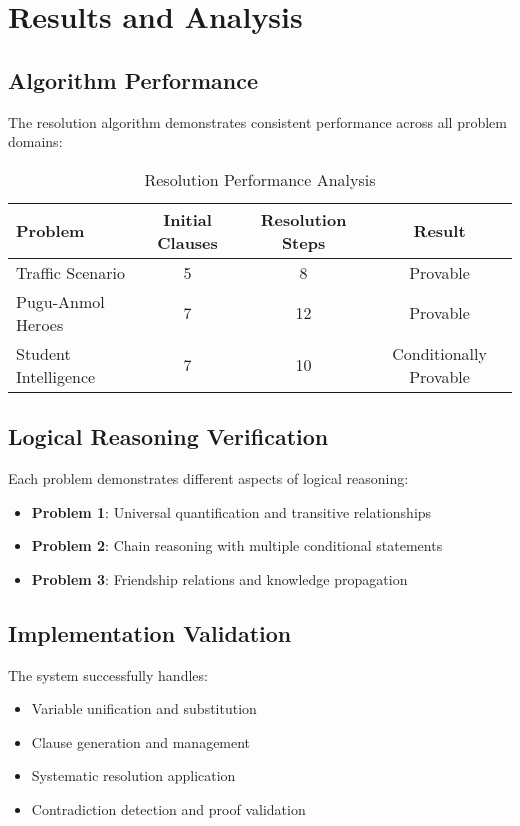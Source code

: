 \documentclass[11pt,a4paper]{article}
\begin{document}
\section{Results and Analysis}

\subsection{Algorithm Performance}

The resolution algorithm demonstrates consistent performance across all problem domains:

\begin{table}[H]
\centering
\caption{Resolution Performance Analysis}
\begin{tabular}{|l|c|c|c|}
\hline
\textbf{Problem} & \textbf{Initial Clauses} & \textbf{Resolution Steps} & \textbf{Result} \\
\hline
Traffic Scenario & 5 & 8 & Provable \\
Pugu-Anmol Heroes & 7 & 12 & Provable \\
Student Intelligence & 7 & 10 & Conditionally Provable \\
\hline
\end{tabular}
\end{table}

\subsection{Logical Reasoning Verification}

Each problem demonstrates different aspects of logical reasoning:

\begin{itemize}
    \item \textbf{Problem 1}: Universal quantification and transitive relationships
    \item \textbf{Problem 2}: Chain reasoning with multiple conditional statements  
    \item \textbf{Problem 3}: Friendship relations and knowledge propagation
\end{itemize}

\subsection{Implementation Validation}

The system successfully handles:
\begin{itemize}
    \item Variable unification and substitution
    \item Clause generation and management
    \item Systematic resolution application
    \item Contradiction detection and proof validation
\end{itemize}
\end{document}
